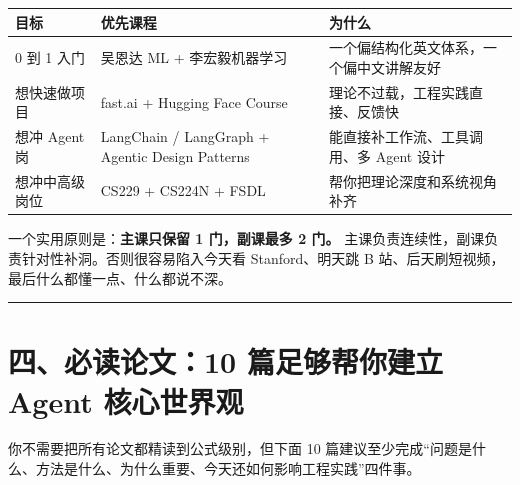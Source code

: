 \begingroup
\scriptsize
\setlength{\tabcolsep}{3pt}
\begin{longtable}{|p{}|p{}|p{}|}
\hline
目标 & 优先课程 & 为什么 \\ \hline
0 到 1 入门 & 吴恩达 ML + 李宏毅机器学习 & 一个偏结构化英文体系，一个偏中文讲解友好 \\ \hline
想快速做项目 & fast.ai + Hugging Face Course & 理论不过载，工程实践直接、反馈快 \\ \hline
想冲 Agent 岗 & LangChain / LangGraph + Agentic Design Patterns & 能直接补工作流、工具调用、多 Agent 设计 \\ \hline
想冲中高级岗位 & CS229 + CS224N + FSDL & 帮你把理论深度和系统视角补齐 \\ \hline
\end{longtable}
\endgroup

一个实用原则是：\textbf{主课只保留 1 门，副课最多 2 门。} 主课负责连续性，副课负责针对性补洞。否则很容易陷入今天看 Stanford、明天跳 B 站、后天刷短视频，最后什么都懂一点、什么都说不深。


\bigskip\hrule\bigskip

\section{四、必读论文：10 篇足够帮你建立 Agent 核心世界观}

你不需要把所有论文都精读到公式级别，但下面 10 篇建议至少完成``问题是什么、方法是什么、为什么重要、今天还如何影响工程实践''四件事。


